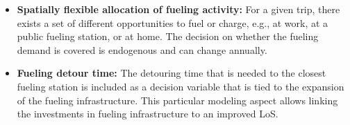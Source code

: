 \documentclass[preprint,review,11pt, authoryear]{elsarticle}
\begin{document}
\begin{itemize}
        \item \textbf{Spatially flexible allocation of fueling activity:} For a given trip, there exists a set of different opportunities to fuel or charge, e.g., at work, at a public fueling station, or at home. The decision on whether the fueling demand is covered is endogenous and can change annually. 

        \item \textbf{Fueling detour time:} The detouring time that is needed to the closest fueling station is included as a decision variable that is tied to the expansion of the fueling infrastructure. This particular modeling aspect allows linking the investments in fueling infrastructure to an improved LoS.
    \end{itemize}
\end{document}
